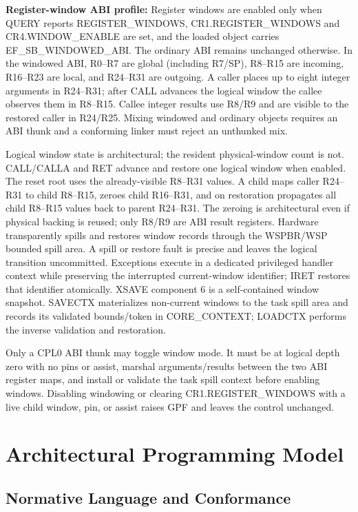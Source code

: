 \documentclass[11pt]{article}
\begin{document}
\textbf{Register-window ABI profile:} Register windows are enabled only when
QUERY reports REGISTER\_WINDOWS, CR1.REGISTER\_WINDOWS and
CR4.WINDOW\_ENABLE are set, and the loaded object carries
EF\_SB\_WINDOWED\_ABI. The ordinary ABI remains unchanged otherwise. In the
windowed ABI, R0--R7 are global (including R7/SP), R8--R15 are incoming,
R16--R23 are local, and R24--R31 are outgoing. A caller places up to eight
integer arguments in R24--R31; after CALL advances the logical window the
callee observes them in R8--R15. Callee integer results use R8/R9 and are
visible to the restored caller in R24/R25. Mixing windowed and ordinary objects
requires an ABI thunk and a conforming linker must reject an unthunked mix.

Logical window state is architectural; the resident physical-window count is
not. CALL/CALLA and RET advance and restore one logical window when enabled.
The reset root uses the already-visible R8--R31 values. A child maps caller
R24--R31 to child R8--R15, zeroes child R16--R31, and on restoration propagates
all child R8--R15 values back to parent R24--R31. The zeroing is architectural
even if physical backing is reused; only R8/R9 are ABI result registers.
Hardware transparently spills and restores window records through the
WSPBR/WSP bounded spill area. A spill or restore fault is precise and leaves
the logical transition uncommitted. Exceptions execute in a dedicated
privileged handler context while preserving the interrupted current-window
identifier; IRET restores that identifier atomically. XSAVE component 6 is a
self-contained window snapshot. SAVECTX materializes non-current windows to
the task spill area and records its validated bounds/token in CORE\_CONTEXT;
LOADCTX performs the inverse validation and restoration.

Only a CPL0 ABI thunk may toggle window mode. It must be at logical depth zero
with no pins or assist, marshal arguments/results between the two ABI register
maps, and install or validate the task spill context before enabling windows.
Disabling windowing or clearing CR1.REGISTER\_WINDOWS with a live child window,
pin, or assist raises GPF and leaves the control unchanged.

\section{Architectural Programming Model}

\subsection{Normative Language and Conformance}
\end{document}
